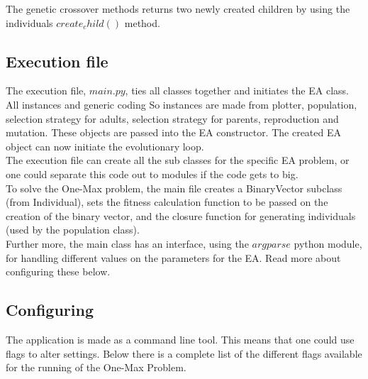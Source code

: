 The genetic crossover methods returns two newly created children by using the individuals $create_child()$ method.

\subsection{Execution file}
The execution file, $main.py$, ties all classes together and initiates the EA class. All instances and generic coding
So instances are made from plotter, population, selection strategy for adults, selection strategy for parents, reproduction
and mutation. These objects are passed into the EA constructor. The created EA object can now initiate the evolutionary
loop. \\

The execution file can create all the sub classes for the specific EA problem, or one could separate this code out to 
modules if the code gets to big. \\

To solve the One-Max problem, the main file creates a BinaryVector subclass (from Individual), sets the fitness
calculation function to be passed on the creation of the binary vector, and the closure function for generating 
individuals (used by the population class). \\

Further more, the main class has an interface, using the $argparse$ python module, for handling different values
on the parameters for the EA. Read more about configuring these below. 

\subsection{Configuring}
The application is made as a command line tool. This means that one could use flags to alter settings. Below there
is a complete list of the different flags available for the running of the One-Max Problem. 

